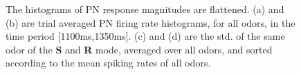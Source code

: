 \documentclass[12pt, a4paper]{article}
\begin{document}

\begin{figure}[htbp]\centering
    \hspace{0.5cm}

\caption[Hist~Flatten]{\label{Figure2:histflatten} \small The histograms of PN response magnitudes are flattened. (a) and (b) are trial averaged PN firing rate histograms, for all odors, in the time period [1100ms,1350ms]. (c) and (d) are the std. of the same odor of the {\bf S} and {\bf R} mode, averaged over all odors, and sorted according to the mean spiking rates of all odors.}
\end{figure}
\end{document}
